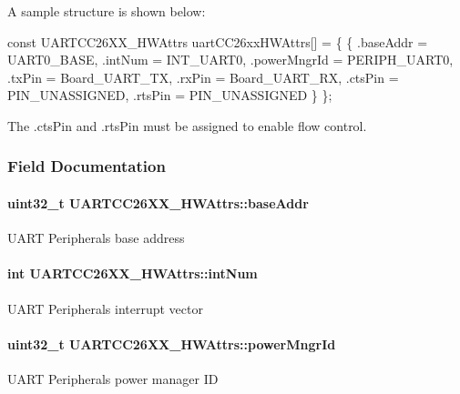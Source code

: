 A sample structure is shown below\+: 
\begin{DoxyCode}
\textcolor{keyword}{const} UARTCC26XX_HWAttrs uartCC26xxHWAttrs[] = \{
    \{
        .baseAddr = UART0\_BASE,
        .intNum = INT\_UART0,
        .powerMngrId = PERIPH\_UART0,
        .txPin = Board\_UART\_TX,
        .rxPin = Board\_UART\_RX,
        .ctsPin = PIN_UNASSIGNED,
        .rtsPin = PIN_UNASSIGNED
    \}
\};
\end{DoxyCode}


The .cts\+Pin and .rts\+Pin must be assigned to enable flow control. 

\subsubsection{Field Documentation}
\paragraph[{base\+Addr}]{\setlength{\rightskip}{0pt plus 5cm}uint32\+\_\+t U\+A\+R\+T\+C\+C26\+X\+X\+\_\+\+H\+W\+Attrs\+::base\+Addr}\label{struct_u_a_r_t_c_c26_x_x___h_w_attrs_aa7747b4d98279e8cad825a56df846af7}
U\+A\+R\+T Peripheral\textquotesingle{}s base address 
\paragraph[{int\+Num}]{\setlength{\rightskip}{0pt plus 5cm}int U\+A\+R\+T\+C\+C26\+X\+X\+\_\+\+H\+W\+Attrs\+::int\+Num}\label{struct_u_a_r_t_c_c26_x_x___h_w_attrs_ab16717e96a640f0908f868e48624d3dd}
U\+A\+R\+T Peripheral\textquotesingle{}s interrupt vector 
\paragraph[{power\+Mngr\+Id}]{\setlength{\rightskip}{0pt plus 5cm}uint32\+\_\+t U\+A\+R\+T\+C\+C26\+X\+X\+\_\+\+H\+W\+Attrs\+::power\+Mngr\+Id}\label{struct_u_a_r_t_c_c26_x_x___h_w_attrs_a4b66ad587cd8c36b48b7cabc166e3c92}
U\+A\+R\+T Peripheral\textquotesingle{}s power manager I\+D 
